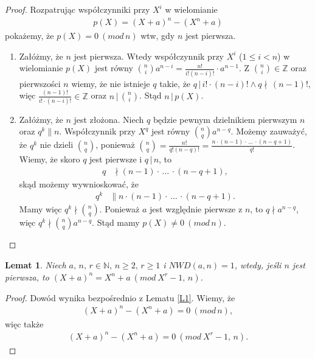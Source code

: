 \documentclass[declaration,shortabstract]{iithesis}
\theoremstyle{definition}
\theoremstyle{remark} \newtheorem{observation}{Obserwacja}
\theoremstyle{plain} \newtheorem{theorem}{Twierdzenie}
\theoremstyle{plain} \newtheorem{lemma}{Lemat}
\theoremstyle{remark} \newtheorem*{remark*}{Uwaga}
\theoremstyle{reminder} \newtheorem*{reminder*}{Przypomnienie}
\begin{document}
\begin{proof}
	Rozpatrując współczynniki przy $X^i$ w wielomianie 
	\begin{align*}
		p(X) = (X + a)^n - (X^n + a) 
	\end{align*}
	pokażemy, że $p(X) = 0 \: (mod \, n)$ wtw, gdy $n$ jest pierwsza. 
	\begin{enumerate}[label=\arabic*.,leftmargin=.4in]
		\item Załóżmy, że $n$ jest pierwsza. Wtedy współczynnik przy $X^i$ ($1 \leq i < n$) w wielomianie $p(X)$ jest równy ${n \choose i}a^{n-i} = \frac{n!}{i!(n-i)!} \cdot a^{n-1}$. Z ${n \choose i} \in \mathbb{Z}$ oraz pierwszości $n$ wiemy, że nie istnieje $q$ takie, że $q \, | \, i! \cdot (n-i)! \wedge q \nmid \, (n - 1)!$, więc $\frac{(n - 1)!}{i! \cdot (n - i)!} \in \mathbb{Z}$ oraz $n \, | \, {n \choose i}$. Stąd $n \, | \, p(X)$.
		\item Załóżmy, że $n$ jest złożona. Niech $q$ będzie pewnym dzielnikiem pierwszym $n$ oraz $q^k \parallel n$. Współczynnik przy $X^q$ jest równy ${n \choose q}a^{n-q}$. Możemy zauważyć, że $q^k$ nie dzieli ${n \choose q}$, ponieważ ${n \choose q} = \frac{n!}{q!(n-q)!} = \frac{n \cdot (n-1) \cdot \, \dots \, \cdot (n - q + 1)}{q!}$. Wiemy, że skoro $q$ jest pierwsze i $q \,| \, n$, to 
		      \begin{align*}
		      	q & \nmid (n-1) \cdot \, \dots \, \cdot (n - q + 1), 
		      \end{align*}
		      skąd możemy wywnioskować, że
		      \begin{align*}
		      	q^k & \parallel n \cdot (n-1) \cdot \, \dots \, \cdot (n - q + 1). 
		      \end{align*}
		      Mamy więc $q^k \nmid {n \choose q}$. Ponieważ $a$ jest względnie pierwsze z $n$, to $q \nmid a^{n-q}$, więc $q^k \nmid {n \choose q}a^{n-q}$. Stąd mamy $p(X) \neq 0 \: (mod \, n)$.
	\end{enumerate}
\end{proof}

\begin{lemma} \label{L2}
	Niech $a,\, n, \, r \in \mathbb{N},\, n \geq 2,\, r \geq 1$ i $NWD(a, n) = 1$, wtedy, jeśli $n$ jest pierwsza, to $(X + a)^n = X^n + a \: (mod \: X^r - 1,\, n)$.
\end{lemma}
	
\begin{proof}
	Dowód wynika bezpośrednio z Lematu \ref{L1}. Wiemy, że 
	\begin{align*}
		(X + a)^n - (X^n + a) = 0 \: (mod \, n), 
	\end{align*}
	więc także 
	\begin{align*}
		(X + a)^n - (X^n + a) = 0 \: (mod \: X^r - 1,\, n). 
	\end{align*}
\end{proof}
\end{document}
